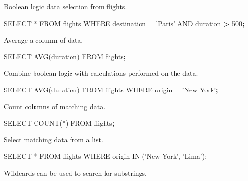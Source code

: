 \documentclass[]{book}
\newenvironment{Shaded}{\begin{snugshade}}{\end{snugshade}}
\newcommand{\ExtensionTok}[1]{#1}
\newcommand{\KeywordTok}[1]{\textcolor[rgb]{0.13,0.29,0.53}{\textbf{#1}}}
\newcommand{\NormalTok}[1]{#1}
\newcommand{\OperatorTok}[1]{\textcolor[rgb]{0.81,0.36,0.00}{\textbf{#1}}}
\newcommand{\StringTok}[1]{\textcolor[rgb]{0.31,0.60,0.02}{#1}}
\begin{document}
Boolean logic data selection from flights.

\begin{Shaded}
\begin{Highlighting}[]
\ExtensionTok{SELECT}\NormalTok{ * FROM flights WHERE destination = }\StringTok{'Paris'}\NormalTok{ AND duration }\OperatorTok{>}\NormalTok{ 500}\KeywordTok{;}
\end{Highlighting}
\end{Shaded}

Average a column of data.

\begin{Shaded}
\begin{Highlighting}[]
\ExtensionTok{SELECT}\NormalTok{ AVG(duration) }\ExtensionTok{FROM}\NormalTok{ flights}\KeywordTok{;}
\end{Highlighting}
\end{Shaded}

Combine boolean logic with calculations performed on the data.

\begin{Shaded}
\begin{Highlighting}[]
\ExtensionTok{SELECT}\NormalTok{ AVG(duration) }\ExtensionTok{FROM}\NormalTok{ flights WHERE origin = }\StringTok{'New York'}\KeywordTok{;}
\end{Highlighting}
\end{Shaded}

Count columns of matching data.

\begin{Shaded}
\begin{Highlighting}[]
\ExtensionTok{SELECT}\NormalTok{ COUNT(*) }\ExtensionTok{FROM}\NormalTok{ flights}\KeywordTok{;}
\end{Highlighting}
\end{Shaded}

Select matching data from a list.

\begin{Shaded}
\begin{Highlighting}[]
\ExtensionTok{SELECT}\NormalTok{ * FROM flights WHERE origin IN (}\StringTok{'New York'}\NormalTok{, }\StringTok{'Lima'}\NormalTok{);}
\end{Highlighting}
\end{Shaded}

Wildcards can be used to search for substrings.

\begin{Shaded}
\end{Shaded}
\end{document}
